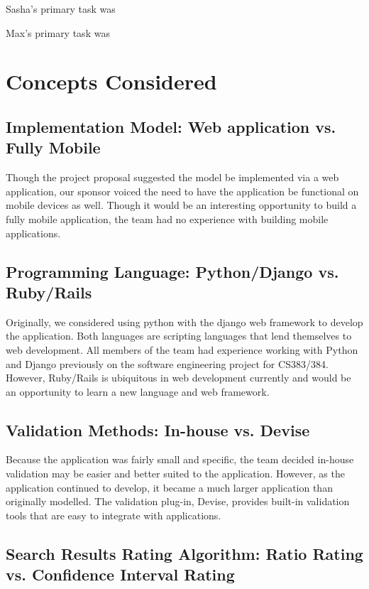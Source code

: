 \documentclass[12pt,english]{article}
\begin{document}
Sasha's primary task was

Max's primary task was


\section{Concepts Considered}


\subsection{Implementation Model: Web application vs. Fully Mobile}

Though the project proposal suggested the model be implemented via
a web application, our sponsor voiced the need to have the application
be functional on mobile devices as well. Though it would be an interesting
opportunity to build a fully mobile application, the team had no experience
with building mobile applications.


\subsection{Programming Language: Python/Django vs. Ruby/Rails}

Originally, we considered using python with the django web framework
to develop the application. Both languages are scripting languages
that lend themselves to web development. All members of the team had
experience working with Python and Django previously on the software
engineering project for CS383/384. However, Ruby/Rails is ubiquitous
in web development currently and would be an opportunity to learn
a new language and web framework.


\subsection{Validation Methods: In-house vs. Devise}

Because the application was fairly small and specific, the team decided
in-house validation may be easier and better suited to the application.
However, as the application continued to develop, it became a much
larger application than originally modelled. The validation plug-in,
Devise, provides built-in validation tools that are easy to integrate
with applications.


\subsection{Search Results Rating Algorithm: Ratio Rating vs. Confidence Interval
Rating}
\end{document}
